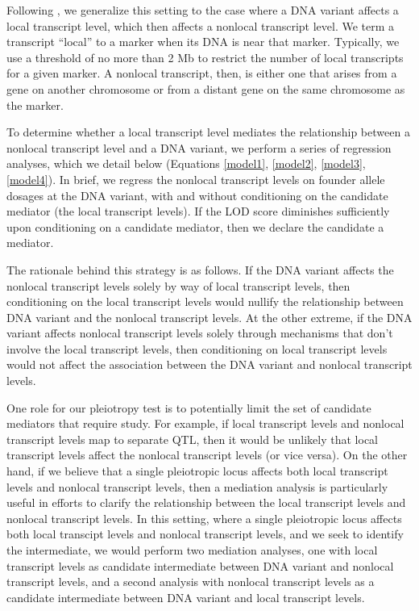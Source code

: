 \documentclass{book}
\begin{document}
Following \citet{keller2018genetic}, we generalize this setting to the case where a DNA variant affects a local transcript level, which then affects a nonlocal transcript level. We term a transcript ``local'' to a marker when its DNA is near that marker. Typically, we use a threshold of no more than 2 Mb to restrict the number of local transcripts for a given marker. A nonlocal transcript, then, is either one that arises from a gene on another chromosome or from a distant gene on the same chromosome as the marker.

To determine whether a local transcript level mediates the relationship between a nonlocal transcript level and a DNA variant, we perform a series of regression analyses, which we detail below (Equations \ref{model1}, \ref{model2}, \ref{model3}, \ref{model4}). In brief, we regress the nonlocal transcript levels on founder allele dosages at the DNA variant, with and without conditioning on the candidate mediator (the local transcript levels). If the LOD score diminishes sufficiently upon conditioning on a candidate mediator, then we declare the candidate a mediator.

The rationale behind this strategy is as follows. If the DNA variant affects the nonlocal transcript levels solely by way of local transcript levels, then conditioning on the local transcript levels would nullify the relationship between DNA variant and the nonlocal transcript levels. At the other extreme, if the DNA variant affects nonlocal transcript levels solely through mechanisms that don't involve the local transcript levels, then conditioning on local transcript levels would not affect the association between the DNA variant and nonlocal transcript levels.

One role for our pleiotropy test is to potentially limit the set of candidate mediators that require study. For example, if local transcript levels and nonlocal transcript levels map to separate QTL, then it would be unlikely that local transcript levels affect the nonlocal transcript levels (or vice versa). On the other hand, if we believe that a single pleiotropic locus affects both local transcript levels and nonlocal transcript levels, then a mediation analysis is particularly useful in efforts to clarify the relationship between the local transcript levels and nonlocal transcript levels. In this setting, where a single pleiotropic locus affects both local transcipt levels and nonlocal transcript levels, and we seek to identify the intermediate, we would perform two mediation analyses, one with local transcript levels as candidate intermediate between DNA variant and nonlocal transcript levels, and a second analysis with nonlocal transcript levels as a candidate intermediate between DNA variant and local transcript levels.
\end{document}
